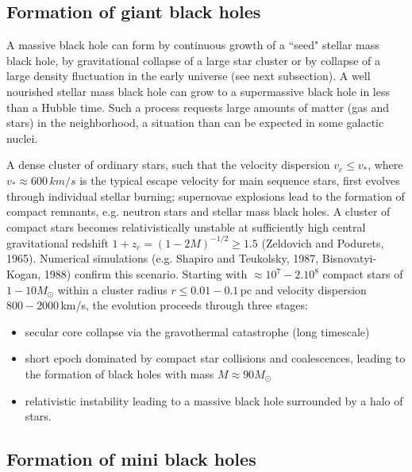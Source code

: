 \documentclass{lamuphys}
\begin{document}
%
\subsection {Formation of giant black holes}

A massive black hole can form by continuous growth of a ``seed" stellar mass black
hole, by gravitational collapse of a large star cluster or by collapse 
of a large density
fluctuation in the early universe (see next subsection).
A well nourished stellar mass black hole can grow to a
supermassive black hole in less than a Hubble time. Such a process requests large
amounts of matter (gas and stars) in the neighborhood, a situation
than can be expected in some galactic nuclei.

A dense cluster of ordinary stars, such that the velocity dispersion $v_c \leq
v_*$, where $v_* \approx 600 \, km/s$ is the typical escape velocity for main sequence
stars, first evolves through individual stellar burning;
supernovae explosions lead to the formation of compact remnants, e.g. neutron stars
and stellar mass black holes. A cluster of compact stars becomes relativistically unstable at
sufficiently high central gravitational redshift $1+z_c = (1-2M)^{-1/2} \geq 1.5$
(Zeldovich and Podurets, 1965). Numerical simulations (e.g. Shapiro and Teukolsky, 1987,
Bisnovatyi-Kogan, 1988) confirm this scenario. Starting with $\approx 10^7 - 2.10^8$ compact
stars of $1-10 M_{\odot}$ within a cluster radius $r \leq 0.01 - 0.1 \,$pc and velocity
dispersion $800-2000 \, $km/s, the evolution proceeds through three stages: 
\begin{itemize}
\item secular core collapse via the gravothermal catastrophe (long timescale)
\item short epoch dominated by compact star collisions and coalescences, leading to the
formation of black holes with mass $M \approx 90 M_{\odot}$
\item relativistic instability leading to a massive black hole surrounded by a halo of
stars.
\end{itemize}    
%
\subsection {Formation of mini black holes}
\end{document}
